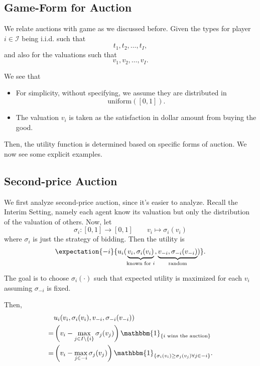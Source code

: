 \subsection{Game-Form for Auction}
We relate auctions with game as we discussed before. Given the types for player \(i\in \mathcal{I} \) being i.i.d. such that
\[
	t_1, t_2, \ldots , t_I,
\]
and also for the valuations such that
\[
	v_1, v_2, \ldots , v_I.
\]

\begin{note}
	We see that
	\begin{itemize}
		\item For simplicity, without specifying, we assume they are distributed in
		      \[
			      \mathrm{uniform} ([0, 1]).
		      \]
		\item The valuation \(v_{i}\) is taken as the satisfaction in dollar amount from buying the good.
	\end{itemize}
\end{note}

Then, the utility function is determined based on specific forms of auction. We now see some explicit examples.

\subsection{Second-price Auction}
We first analyze second-price auction, since it's easier to analyze. Recall the Interim Setting, namely each agent know its valuation but
only the distribution of the valuation of others. Now, let
\[
	\sigma_{i}\colon [0, 1]\to [0, 1]\qquad v_{i}\mapsto  \sigma_{i}(v_{i})
\]
where \(\sigma_{i}\) is just the strategy of bidding. Then the utility is
\[
	\expectation{-i}{u_{i}(\underbrace{v_{i}, \sigma_{i}(v_{i})}_{\text{known for \(i\)}}, \underbrace{v_{-i}, \sigma_{-i}(v_{-i})}_{\text{random}})}.
\]

The goal is to choose \(\sigma_{i}(\cdot)\) such that expected utility is maximized for each \(v_{i}\)
assuming \(\sigma_{-i}\) is fixed.

Then,
\[
	\begin{split}
		&u_{i}(v_{i}, \sigma_{i}(v_{i}), v_{-i}, \sigma_{-i}(v_{-i}))\\
		=&\left(v_{i} - \max_{j\in I\setminus\{i\}}\sigma_{j}(v_{j})\right)\mathbbm{1}_{\{\text{\(i\) wins the auction}\}}\\
		=&\left(v_{i} - \max_{j\in -i}\sigma_{j}(v_{j})\right)\mathbbm{1}_{\{ \sigma_{i}(v_{i})\geq \sigma_{j}(v_{j}) \forall j\in -i \}}.
	\end{split}
\]

